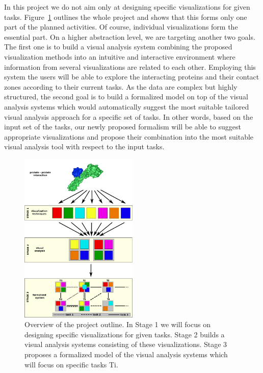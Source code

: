 \documentclass[11pt,a4paper,titlepage,oneside,onecolumn]{article}
\begin{document}
In this project we do not aim only at designing specific visualizations for given tasks.
Figure~\ref{fig:system} outlines the whole project and shows that this forms only one part of the planned activities.  
Of course, individual visualizations form the essential part.
On a higher abstraction level, we are targeting another two goals.
The first one is to build a visual analysis system combining the proposed visualization methods into an intuitive and interactive environment where information from several visualizations are related to each other.
Employing this system the users will be able to explore the interacting proteins and their contact zones according to their current tasks.
As the data are complex but highly structured, the second goal is to build a formalized model on top of the visual analysis systems which would automatically suggest the most suitable tailored visual analysis approach for a specific set of tasks.
In other words, based on the input set of the tasks, our newly proposed formalism will be able to suggest appropriate visualizations and propose their combination into the most suitable visual analysis tool with respect to the input tasks.


\begin{figure}[htb]
\centering
\includegraphics[width=0.5\textwidth]{pics/system.png}
\caption{Overview of the project outline. In Stage 1 we will focus on designing specific visualizations for given tasks. Stage 2 builds a visual analysis systems consisting of these visualizations. Stage 3 proposes a formalized model of the visual analysis systems which will focus on specific tasks Ti.}
\label{fig:system}
\end{figure}
\end{document}
